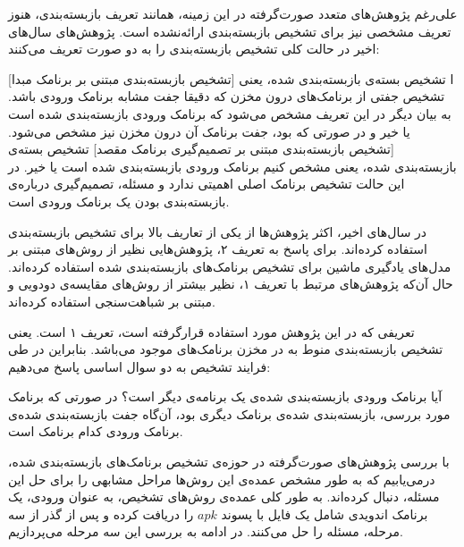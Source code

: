 علی‌رغم پژوهش‌های متعدد صورت‌گرفته در این زمینه، همانند تعریف بازبسته‌بندی، هنوز تعریف مشخصی نیز برای تشخیص بازبسته‌بندی ارائه‌نشده‌ است. پژوهش‌های سال‌های اخیر در حالت کلی تشخیص بازبسته‌بندی را به دو صورت تعریف می‌کنند:‌



[تشخیص بازبسته‌بندی مبتنی بر برنامک مبدا]
ا\label{tarif1} تشخیص بسته‌ی بازبسته‌بندی شده، یعنی تشخیص جفتی از برنامک‌های درون مخزن که دقیقا جفت مشابه برنامک ورودی باشد. به بیان دیگر در این تعریف مشخص می‌شود که برنامک ورودی بازبسته‌بندی شده است یا خیر و در صورتی که بود، جفت برنامک آن درون مخزن نیز مشخص می‌شود.
[تشخیص بازبسته‌بندی مبتنی بر تصمیم‌گیری برنامک مقصد]
\label{tarif2} تشخیص بسته‌ی بازبسته‌بندی شده، یعنی مشخص کنیم برنامک ورودی بازبسته‌بندی شده است یا خیر. در این حالت تشخیص برنامک اصلی اهمیتی ندارد و مسئله، تصمیم‌گیری  درباره‌ی بازبسته‌بندی بودن یک برنامک ورودی است.






در سال‌های اخیر، اکثر پژوهش‌ها از یکی از تعاریف بالا برای تشخیص بازبسته‌بندی استفاده کرده‌اند. برای پاسخ به تعریف ۲، پژوهش‌هایی نظیر  از روش‌های مبتنی بر مدل‌های یادگیری ماشین برای تشخیص برنامک‌های بازبسته‌‌بندی شده استفاده کرده‌اند. حال آن‌که پژوهش‌های مرتبط با تعریف ۱، نظیر   بیشتر از روش‌های مقایسه‌ی دودویی و مبتنی بر شباهت‌سنجی استفاده کرده‌اند. 

تعریفی که در این پژوهش مورد استفاده قرار‌گرفته‌ است، تعریف ۱ است. یعنی تشخیص بازبسته‌بندی منوط به در مخزن برنامک‌های موجود می‌باشد. بنابراین در طی فرایند تشخیص به دو سوال اساسی پاسخ می‌دهیم:‌

 آیا برنامک ورودی بازبسته‌بندی شده‌ی یک برنامه‌ی دیگر است؟‌
 در صورتی که برنامک مورد بررسی، بازبسته‌بندی شده‌ی برنامک دیگری بود، آن‌گاه جفت بازبسته‌بندی شده‌ی برنامک ورودی کدام برنامک است.


با بررسی پژوهش‌های صورت‌گرفته در حوزه‌ی تشخیص برنامک‌های بازبسته‌بندی شده، درمی‌یابیم که به طور مشخص عمده‌ی این روش‌ها مراحل مشابهی را برای حل این مسئله، دنبال کرده‌اند. به طور کلی عمده‌ی روش‌های تشخیص، به عنوان ورودی، یک برنامک اندویدی شامل یک فایل با پسوند $apk$ را دریافت کرده و پس از گذر از سه مرحله، مسئله را حل می‌کنند. در ادامه به بررسی این سه مرحله می‌پردازیم.


